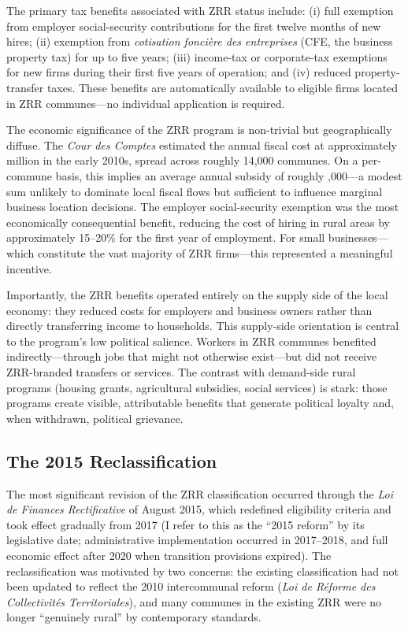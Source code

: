 \documentclass[12pt]{article}
\begin{document}
The primary tax benefits associated with ZRR status include: (i) full exemption from employer social-security contributions for the first twelve months of new hires; (ii) exemption from \textit{cotisation fonci\`{e}re des entreprises} (CFE, the business property tax) for up to five years; (iii) income-tax or corporate-tax exemptions for new firms during their first five years of operation; and (iv) reduced property-transfer taxes. These benefits are automatically available to eligible firms located in ZRR communes---no individual application is required.

The economic significance of the ZRR program is non-trivial but geographically diffuse. The \textit{Cour des Comptes} estimated the annual fiscal cost at approximately  million in the early 2010s, spread across roughly 14,000 communes. On a per-commune basis, this implies an average annual subsidy of roughly ,000---a modest sum unlikely to dominate local fiscal flows but sufficient to influence marginal business location decisions. The employer social-security exemption was the most economically consequential benefit, reducing the cost of hiring in rural areas by approximately 15--20\% for the first year of employment. For small businesses---which constitute the vast majority of ZRR firms---this represented a meaningful incentive.

Importantly, the ZRR benefits operated entirely on the supply side of the local economy: they reduced costs for employers and business owners rather than directly transferring income to households. This supply-side orientation is central to the program's low political salience. Workers in ZRR communes benefited indirectly---through jobs that might not otherwise exist---but did not receive ZRR-branded transfers or services. The contrast with demand-side rural programs (housing grants, agricultural subsidies, social services) is stark: those programs create visible, attributable benefits that generate political loyalty and, when withdrawn, political grievance.

\subsection{The 2015 Reclassification}

The most significant revision of the ZRR classification occurred through the \textit{Loi de Finances Rectificative} of August 2015, which redefined eligibility criteria and took effect gradually from 2017 (I refer to this as the ``2015 reform'' by its legislative date; administrative implementation occurred in 2017--2018, and full economic effect after 2020 when transition provisions expired). The reclassification was motivated by two concerns: the existing classification had not been updated to reflect the 2010 intercommunal reform (\textit{Loi de R\'{e}forme des Collectivit\'{e}s Territoriales}), and many communes in the existing ZRR were no longer ``genuinely rural'' by contemporary standards.
\end{document}
